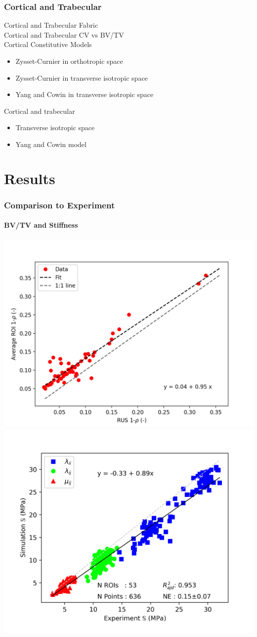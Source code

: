 \documentclass[xcolor=table,11pt]{beamer}
\begin{document}
	\begin{frame}
		\frametitle{Cortical and Trabecular}
		\vfill Cortical and Trabecular Fabric\\
		\vfill Cortical and Trabecular CV vs BV/TV\\
		\vfill Cortical Constitutive Models
		\begin{itemize}
			\item Zysset-Curnier in orthotropic space
			\item Zysset-Curnier in transverse isotropic space
			\item Yang and Cowin in transverse isotropic space
		\end{itemize}
		\vfill Cortical and trabecular
		\begin{itemize}
			\item Transverse isotropic space
			\item Yang and Cowin model
		\end{itemize}
	\end{frame}

	
	\section{Results}

	\begin{frame}
		\frametitle{Comparison to Experiment}
		\framesubtitle{BV/TV and Stiffness}
		\centering
		\includegraphics[height=0.35\linewidth]{../Results/ExpSim_Rho}
		\includegraphics[height=0.35\linewidth]{../Results/ExpSim_S_Filt}
	\end{frame}
\end{document}
